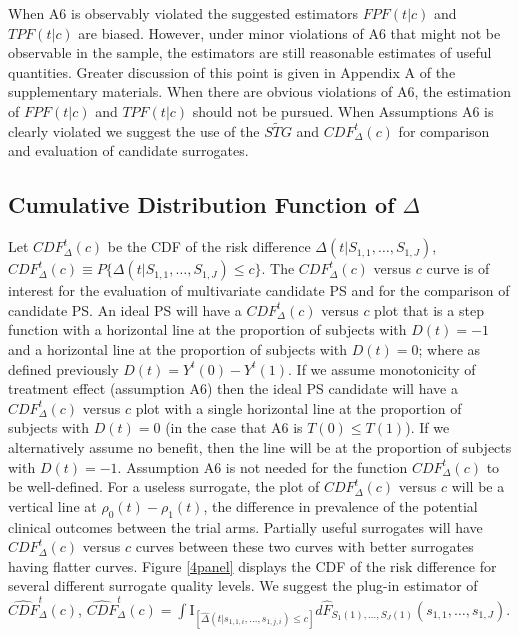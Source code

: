 \documentclass[times, doublespace]{simauth}
\begin{document}
When A6 is observably violated the suggested estimators $FPF(t|c)$ and $TPF(t|c)$ are biased. However, under minor violations of A6 that might not be observable in the sample, the estimators are still reasonable estimates of useful quantities. Greater discussion of this point is given in Appendix A of the supplementary materials. When there are obvious violations of A6, the estimation of $FPF(t|c)$ and $TPF(t|c)$ should not be pursued. When Assumptions A6 is clearly violated we suggest the use of the $\widetilde{STG}$ and $CDF^{t}_{\Delta}(c)$ for comparison and evaluation of candidate surrogates.

\subsection{Cumulative Distribution Function of $\Delta$} \label{CDF}

 Let $CDF^{t}_{\Delta}(c)$ be the CDF of the risk difference $\Delta(t|S_{1,1}, \dots, S_{1,J})$, $CDF^{t}_{\Delta}(c)\equiv P\{\Delta(t|S_{1,1}, \dots, S_{1,J})\leq c\}.$ The $CDF^{t}_{\Delta}(c)$ versus $c$ curve is of interest for the evaluation of multivariate candidate PS and for the comparison of candidate PS. An ideal PS will have a $CDF^{t}_{\Delta}(c)$ versus $c$ plot that is a step function with a horizontal line at the proportion of subjects with $D(t)=-1$ and a horizontal line at the proportion of subjects with $D(t)=0$; where as defined previously $D(t)=Y^{t}(0)-Y^{t}(1)$. If we assume monotonicity of treatment effect (assumption A6) then the ideal PS candidate will have a $CDF^{t}_{\Delta}(c)$ versus $c$ plot with a single horizontal line at the proportion of subjects with $D(t)=0$ (in the case that A6 is $T(0) \leq T(1)$). If we alternatively assume no benefit, then the line will be at the proportion of subjects with $D(t)=-1$. Assumption A6 is not needed for the function $CDF^{t}_{\Delta}(c)$ to be well-defined. For a useless surrogate, the plot of $CDF^{t}_{\Delta}(c)$ versus $c$ will be a vertical line at $\rho_0(t)-\rho_1(t)$, the difference in prevalence of the potential clinical outcomes between the trial arms. Partially useful surrogates will have $CDF^{t}_{\Delta}(c)$ versus $c$ curves between these two curves with better surrogates having flatter curves. Figure \ref{4panel} displays the CDF of the risk difference for several different surrogate quality levels. We suggest the plug-in estimator of $\widehat{CDF}^{t}_{\Delta}(c)$, $\widehat{CDF}^{t}_{\Delta}(c)=\int{\mathrm{I}_{[\hat{\Delta}(t|s_{1,1,i}, \dots, s_{1,j,i})\leq c]} d\hat{F}_{S_1(1), \ldots, S_J(1)}(s_{1,1}, \dots, s_{1,J})}$. 
\end{document}
